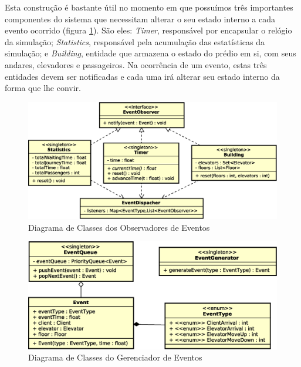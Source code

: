 Esta construção é bastante útil no momento em que possuímos três importantes
componentes do sistema que necessitam alterar o seu estado interno a cada evento
ocorrido (figura \ref{fig:diagram:observers}). São eles: \textit{Timer},
responsável por encapsular o relógio da simulação; \textit{Statistics},
responsável pela acumulação das estatísticas da simulação; e \textit{Building},
entidade que armazena o estado do prédio em si, com seus andares, elevadores e
passageiros. Na ocorrência de um evento, estas três entidades devem ser
notificadas e cada uma irá alterar seu estado interno da forma que lhe convir.

\begin{figure}[htb!]
  \centering
  \includegraphics[scale=0.6]{img/observers.eps}
  \caption{Diagrama de Classes dos Observadores de Eventos}
\label{fig:diagram:observers}
\end{figure}

\begin{figure}[htb!]
  \centering
  \includegraphics[scale=0.6]{img/event_management.eps}
  \caption{Diagrama de Classes do Gerenciador de Eventos}
\label{fig:diagram:event:manage}
\end{figure}

